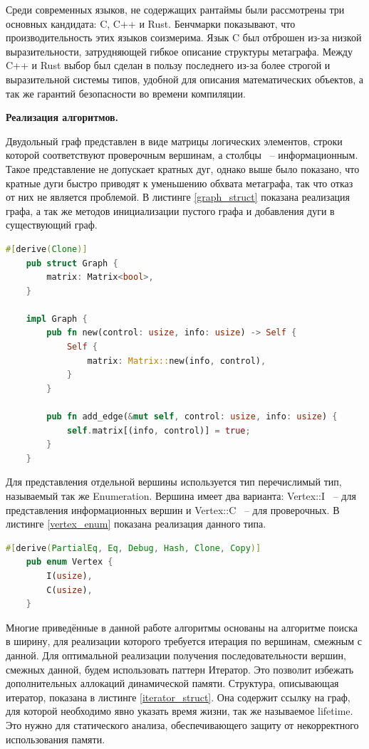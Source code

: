 \documentclass[14pt]{mmcs-article}
\begin{document}
Среди современных языков, не содержащих рантаймы были рассмотрены три основных кандидата: C, C++ и Rust. Бенчмарки показывают, что производительность этих языков соизмерима. Язык C был отброшен из-за низкой выразительности, затрудняющей гибкое описание структуры метаграфа. Между C++ и Rust выбор был сделан в пользу последнего из-за более строгой и выразительной системы типов, удобной для описания математических объектов, а так же гарантий безопасности во времени компиляции.

\textbf{Реализация алгоритмов.}

Двудольный граф представлен в виде матрицы логических элементов, строки которой соответствуют проверочным вершинам, а столбцы ~-- информационным. Такое представление не допускает кратных дуг, однако выше было показано, что кратные дуги быстро приводят к уменьшению обхвата метаграфа, так что отказ от них не является проблемой. В листинге \ref{graph_struct} показана реализация графа, а так же методов инициализации пустого графа и добавления дуги в существующий граф.

\begin{lstlisting}[language=Rust, caption={ Структура, описывающая граф и некоторые её методы. }, label=graph_struct]
    #[derive(Clone)]
    pub struct Graph {
        matrix: Matrix<bool>,
    }

    impl Graph {
        pub fn new(control: usize, info: usize) -> Self {
            Self {
                matrix: Matrix::new(info, control),
            }
        }

        pub fn add_edge(&mut self, control: usize, info: usize) {
            self.matrix[(info, control)] = true;
        }
    }
\end{lstlisting}

Для представления отдельной вершины используется тип перечислимый тип, называемый так же Enumeration. Вершина имеет два варианта: Vertex::I ~-- для представления информационных вершин и Vertex::C ~-- для проверочных. В листинге \ref{vertex_enum} показана реализация данного типа.

\begin{lstlisting}[language=Rust, caption={ Перечисление, описывающее вершину графа. }, label=vertex_enum]
    #[derive(PartialEq, Eq, Debug, Hash, Clone, Copy)]
    pub enum Vertex {
        I(usize),
        C(usize),
    }
\end{lstlisting}

Многие приведённые в данной работе алгоритмы основаны на алгоритме поиска в ширину, для реализации которого требуется итерация по вершинам, смежным с данной. Для оптимальной реализации получения последовательности вершин, смежных данной, будем использовать паттерн Итератор. Это позволит избежать дополнительных аллокаций динамической памяти. Структура, описывающая итератор, показана в листинге \ref{iterator_struct}. Она содержит ссылку на граф, для которой необходимо явно указать время жизни, так же называемое lifetime. Это нужно для статического анализа, обеспечивающего защиту от некорректного использования памяти. 
\end{document}
